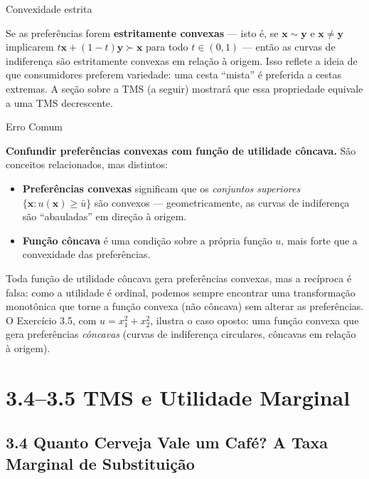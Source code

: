 \documentclass[11pt,twoside,openright]{book}
\providecommand{\tightlist}{\setlength{\itemsep}{0pt}\setlength{\parskip}{0pt}}
\begin{document}
\begin{tipbox}{Convexidade estrita}

Se as preferências forem \textbf{estritamente convexas} --- isto é, se
\(\mathbf{x} \sim \mathbf{y}\) e \(\mathbf{x} \neq \mathbf{y}\)
implicarem \(t\mathbf{x} + (1-t)\mathbf{y} \succ \mathbf{x}\) para todo
\(t \in (0,1)\) --- então as curvas de indiferença são estritamente
convexas em relação à origem. Isso reflete a ideia de que consumidores
preferem variedade: uma cesta ``mista'' é preferida a cestas extremas. A
seção sobre a TMS (a seguir) mostrará que essa propriedade equivale a
uma TMS decrescente.

\end{tipbox}

\begin{warningbox}{Erro Comum}

\textbf{Confundir preferências convexas com função de utilidade
côncava.} São conceitos relacionados, mas distintos:

\begin{itemize}
\tightlist
\item
  \textbf{Preferências convexas} significam que os \emph{conjuntos
  superiores} \(\{\mathbf{x} : u(\mathbf{x}) \geq \bar{u}\}\) são
  convexos --- geometricamente, as curvas de indiferença são
  ``abauladas'' em direção à origem.
\item
  \textbf{Função côncava} é uma condição sobre a própria função \(u\),
  mais forte que a convexidade das preferências.
\end{itemize}

Toda função de utilidade côncava gera preferências convexas, mas a
recíproca é falsa: como a utilidade é ordinal, podemos sempre encontrar
uma transformação monotônica que torne a função convexa (não côncava)
sem alterar as preferências. O Exercício 3.5, com \(u = x_1^2 + x_2^2\),
ilustra o caso oposto: uma função convexa que gera preferências
\emph{côncavas} (curvas de indiferença circulares, côncavas em relação à
origem).

\end{warningbox}

\chapter{3.4--3.5 TMS e Utilidade
Marginal}\label{tms-e-utilidade-marginal}

\section{3.4 Quanto Cerveja Vale um Café? A Taxa Marginal de
Substituição}\label{quanto-cerveja-vale-um-cafuxe9-a-taxa-marginal-de-substituiuxe7uxe3o}
\end{document}
